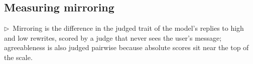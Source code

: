 \documentclass[11pt]{article}
\newcommand{\flow}[1]{\par\noindent\textcolor{blue!60!black}{\small$\triangleright$\ #1}\par\medskip}
\begin{document}
\subsection{Measuring mirroring}
\flow{Mirroring is the difference in the judged trait of the model's replies to high and low rewrites, scored by a judge that never sees the user's message; agreeableness is also judged pairwise because absolute scores sit near the top of the scale.}
\end{document}
